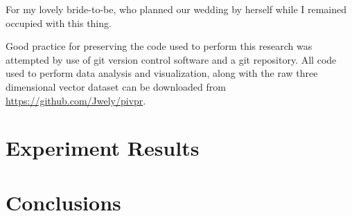 \documentclass[12pt]{report}	%
\begin{document}
\beforepreface

For my lovely bride-to-be, who planned our wedding by herself while I remained 
occupied with this thing.

Good practice for preserving the code used to perform this research was 
attempted by use of git version control software and a git repository. All code 
used to perform data analysis and visualization, along with the raw three 
dimensional vector dataset can be downloaded from 
\url{https://github.com/Jwely/pivpr}.
%
\fi

\afterpreface
\iffalse		%
\chapter{Introduction}



\fi
\iffalse		%
\chapter{Experiment Setup}







\fi
\iftrue		%
\chapter{Experiment Results}


\fi
\iftrue		%
\chapter{Conclusions}

\fi


\end{document}
